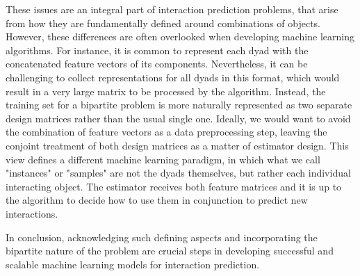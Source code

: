 These issues are an integral part of interaction prediction problems,
that arise from how they are fundamentally defined around combinations of objects.
%
However, these differences are often overlooked when developing machine learning algorithms.  %
%
For instance, it is common to represent each dyad with the concatenated feature vectors of its components. Nevertheless, it can be challenging to collect representations for all dyads in this format, which would result in a very large matrix to be processed by the algorithm.
%
Instead, the training set for a bipartite problem is more naturally represented as two separate design matrices rather than the usual single one.
Ideally, we would want to avoid the combination of feature vectors as a data preprocessing step, leaving the conjoint treatment of both design matrices as a matter of estimator design. This view defines a different machine learning paradigm, in which what we call "instances" or "samples" are not the dyads themselves, but rather each individual interacting object. The estimator receives both feature matrices and it is up to the algorithm to decide how to use them in conjunction to predict new interactions.


In conclusion, acknowledging such defining aspects and incorporating the bipartite nature of the problem are crucial steps in developing successful and scalable machine learning models for interaction prediction.


